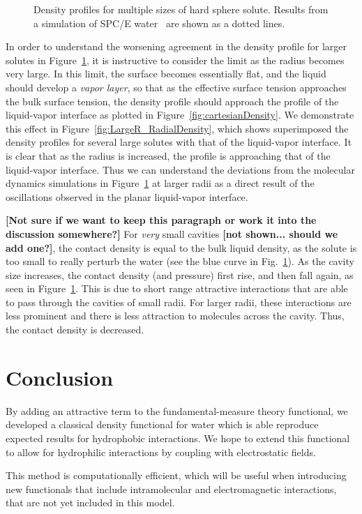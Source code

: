\documentclass[letterpaper,twocolumn,amsmath,amssymb,prb]{revtex4-1}
\newcommand{\red}[1]{{\bf \color{red} #1}}
\newcommand{\fixme}[1]{\red{[#1]}}
\begin{document}
\begin{figure}[b]
\begin{center}
\end{center}
\caption{Density profiles for multiple sizes of hard sphere solute.
  Results from a simulation of SPC/E water~\cite{huang2001shs} are
  shown as a dotted lines.}
\label{fig:cavities}
\end{figure}

In order to understand the worsening agreement in the density profile
for larger solutes in Figure~\ref{fig:cavities}, it is instructive to
consider the limit as the radius becomes very large.  In this limit,
the surface becomes essentially flat, and the liquid should develop a
\emph{vapor layer}, so that as the effective surface tension
approaches the bulk surface tension, the density profile should
approach the profile of the liquid-vapor interface as plotted in
Figure~\ref{fig:cartesianDensity}.  We demonstrate this effect in
Figure~\ref{fig:LargeR_RadialDensity}, which shows superimposed the
density profiles for several large solutes with that of the
liquid-vapor interface.  It is clear that as the radius is increased,
the profile is approaching that of the liquid-vapor interface.  Thus
we can understand the deviations from the molecular dynamics
simulations in Figure~\ref{fig:cavities} at larger radii as a direct
result of the oscillations observed in the planar liquid-vapor
interface.

\fixme{Not sure if we want to keep this paragraph or work it into the
  discussion somewhere?} For \emph{very} small cavities \fixme{not
  shown... should we add one?}, the contact density is equal to the
bulk liquid density, as the solute is too small to really perturb the
water (see the blue curve in Fig.~\ref{fig:cavities}).  As the cavity
size increases, the contact density (and pressure) first rise, and
then fall again, as seen in Figure~\ref{fig:cavities}.  This is due to
short range attractive interactions that are able to pass through the
cavities of small radii.  For larger radii, these interactions are
less prominent and there is less attraction to molecules across the
cavity.  Thus, the contact density is decreased.

\section{Conclusion}
By adding an attractive term to the fundamental-measure theory
functional, we developed a classical density functional for water
which is able reproduce expected results for hydrophobic
interactions.  We hope to extend this functional to allow for
hydrophilic interactions by coupling with electrostatic fields.

This method is computationally efficient, which will be useful when
introducing new functionals that include intramolecular and electromagnetic
interactions, that are not yet included in this model.

\end{document}
